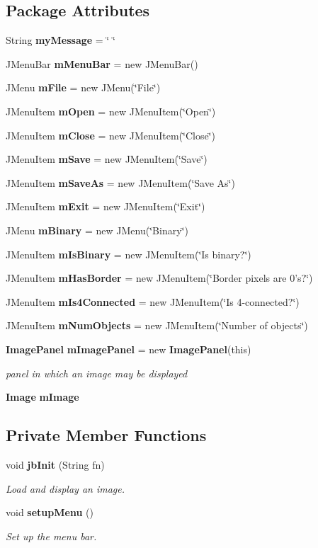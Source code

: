 \subsection*{Package Attributes}
\begin{CompactItemize}
\item 
String {\bf my\-Message} = \char`\"{} \char`\"{}
\item 
JMenu\-Bar {\bf m\-Menu\-Bar} = new JMenu\-Bar()
\item 
JMenu {\bf m\-File} = new JMenu(\char`\"{}File\char`\"{})
\item 
JMenu\-Item {\bf m\-Open} = new JMenu\-Item(\char`\"{}Open\char`\"{})
\item 
JMenu\-Item {\bf m\-Close} = new JMenu\-Item(\char`\"{}Close\char`\"{})
\item 
JMenu\-Item {\bf m\-Save} = new JMenu\-Item(\char`\"{}Save\char`\"{})
\item 
JMenu\-Item {\bf m\-Save\-As} = new JMenu\-Item(\char`\"{}Save As\char`\"{})
\item 
JMenu\-Item {\bf m\-Exit} = new JMenu\-Item(\char`\"{}Exit\char`\"{})
\item 
JMenu {\bf m\-Binary} = new JMenu(\char`\"{}Binary\char`\"{})
\item 
JMenu\-Item {\bf m\-Is\-Binary} = new JMenu\-Item(\char`\"{}Is binary?\char`\"{})
\item 
JMenu\-Item {\bf m\-Has\-Border} = new JMenu\-Item(\char`\"{}Border pixels are 0's?\char`\"{})
\item 
JMenu\-Item {\bf m\-Is4Connected} = new JMenu\-Item(\char`\"{}Is 4-connected?\char`\"{})
\item 
JMenu\-Item {\bf m\-Num\-Objects} = new JMenu\-Item(\char`\"{}Number of objects\char`\"{})
\item 
{\bf Image\-Panel} {\bf m\-Image\-Panel} = new {\bf Image\-Panel}(this)
\begin{CompactList}\small\item\em panel in which an image may be displayed \item\end{CompactList}\item 
{\bf Image} {\bf m\-Image}
\end{CompactItemize}
\subsection*{Private Member Functions}
\begin{CompactItemize}
\item 
void {\bf jb\-Init} (String fn)
\begin{CompactList}\small\item\em Load and display an image. \item\end{CompactList}\item 
void {\bf setup\-Menu} ()
\begin{CompactList}\small\item\em Set up the menu bar. \item\end{CompactList}\end{CompactItemize}


